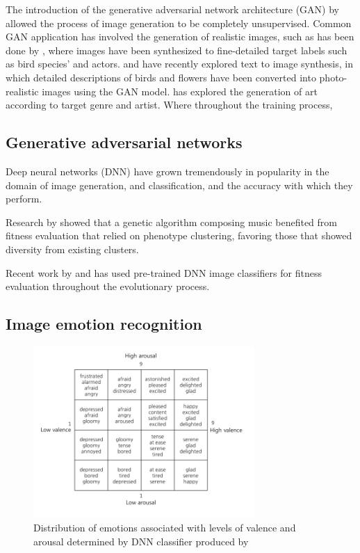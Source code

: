 \documentclass{article}
\begin{document}
The introduction of the generative adversarial network architecture (GAN) by \citet{GAN} allowed the process of image generation to be completely unsupervised.
Common GAN application has involved the generation of realistic images, such as has been done by \citet{bao2017cvae}, where images have been synthesized to fine-detailed target labels such as bird species' and actors.
\citet{zhang2017stackgan} and \citet{reed2016generative} have recently explored text to image synthesis, in which detailed descriptions of birds and flowers have been converted into photo-realistic images using the GAN model.
\citet{tan2017artgan} has explored the generation of art according to target genre and artist.
Where throughout the training process,

\subsection{Generative adversarial networks}
Deep neural networks (DNN) have grown tremendously in popularity in the domain of image generation, and classification, and the accuracy with which they perform.

Research by \citet{burton1998genetic} showed that a genetic algorithm composing music benefited from fitness evaluation that relied on phenotype clustering, favoring those that showed diversity from existing clusters.

Recent work by \citet{nguyen2015deep} and \citet{nguyen2015innovation} has used pre-trained DNN image classifiers for fitness evaluation throughout the evolutionary process.
	
\subsection{Image emotion recognition}
	
\begin{figure}[h!]
	\includegraphics[width=0.75\textwidth]{images/valence-arousal-grid.png}
	\caption{Distribution of emotions associated with levels of valence and arousal determined by DNN classifier produced by \citet{kim2018building}}
	\label{fig:valence-arousal}
\end{figure}
\end{document}
